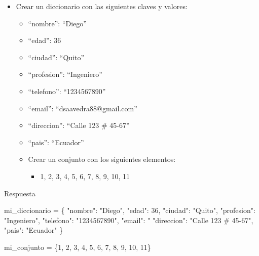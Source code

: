 \documentclass[
  a4paper,
  DIV=11,
  numbers=noendperiod,
  onepage,
  openany]{scrreprt}
\newenvironment{Shaded}{\begin{snugshade}}{\end{snugshade}}
\newcommand{\DecValTok}[1]{\textcolor[rgb]{0.68,0.00,0.00}{#1}}
\newcommand{\ErrorTok}[1]{\textcolor[rgb]{0.68,0.00,0.00}{#1}}
\newcommand{\NormalTok}[1]{\textcolor[rgb]{0.00,0.23,0.31}{#1}}
\newcommand{\OperatorTok}[1]{\textcolor[rgb]{0.37,0.37,0.37}{#1}}
\newcommand{\StringTok}[1]{\textcolor[rgb]{0.13,0.47,0.30}{#1}}
\providecommand{\tightlist}{%
  \setlength{\itemsep}{0pt}\setlength{\parskip}{0pt}}\usepackage{longtable,booktabs,array}
\begin{document}
\begin{itemize}
\tightlist
\item
  Crear un diccionario con las siguientes claves y valores:

  \begin{itemize}
  \tightlist
  \item
    ``nombre'': ``Diego''
  \item
    ``edad'': 36
  \item
    ``ciudad'': ``Quito''
  \item
    ``profesion'': ``Ingeniero''
  \item
    ``telefono'': ``1234567890''
  \item
    ``email'': ``dsaavedra88@gmail.com''
  \item
    ``direccion'': ``Calle 123 \# 45-67''
  \item
    ``pais'': ``Ecuador''
  \item
    Crear un conjunto con los siguientes elementos:

    \begin{itemize}
    \tightlist
    \item
      1, 2, 3, 4, 5, 6, 7, 8, 9, 10, 11
    \end{itemize}
  \end{itemize}
\end{itemize}

Respuesta

\begin{Shaded}
\begin{Highlighting}[]
\NormalTok{mi\_diccionario }\OperatorTok{=}\NormalTok{ \{}
    \StringTok{"nombre"}\NormalTok{: }\StringTok{"Diego"}\NormalTok{,}
    \StringTok{"edad"}\NormalTok{: }\DecValTok{36}\NormalTok{,}
    \StringTok{"ciudad"}\NormalTok{: }\StringTok{"Quito"}\NormalTok{,}
    \StringTok{"profesion"}\NormalTok{: }\StringTok{"Ingeniero"}\NormalTok{,}
    \StringTok{"telefono"}\NormalTok{: }\StringTok{"1234567890"}\NormalTok{,}
    \StringTok{"email"}\NormalTok{: }\StringTok{"}
\ErrorTok{    "direccion": "Calle 123 \# 45{-}67",}
    \StringTok{"pais"}\NormalTok{: }\StringTok{"Ecuador"}
\NormalTok{\}}

\NormalTok{mi\_conjunto }\OperatorTok{=}\NormalTok{ \{}\DecValTok{1}\NormalTok{, }\DecValTok{2}\NormalTok{, }\DecValTok{3}\NormalTok{, }\DecValTok{4}\NormalTok{, }\DecValTok{5}\NormalTok{, }\DecValTok{6}\NormalTok{, }\DecValTok{7}\NormalTok{, }\DecValTok{8}\NormalTok{, }\DecValTok{9}\NormalTok{, }\DecValTok{10}\NormalTok{, }\DecValTok{11}\NormalTok{\}}
\end{Highlighting}
\end{Shaded}
\end{document}
